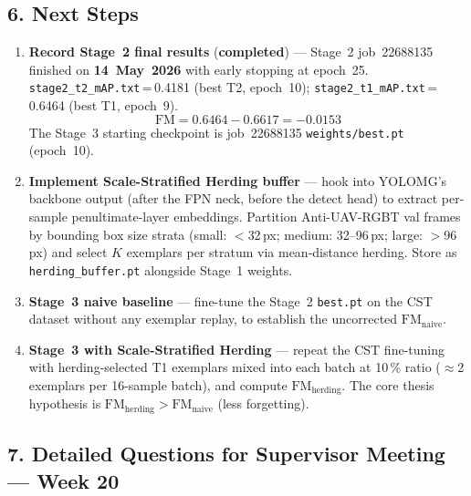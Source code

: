 \subsection*{6. Next Steps}

\begin{enumerate}
    \item \textbf{Record Stage~2 final results} (\textbf{completed}) —
          Stage~2 job~22688135 finished on \textbf{14~May~2026}
          with early stopping at epoch~25.
          \texttt{stage2\_t2\_mAP.txt}\,=\,0.4181 (best T2, epoch~10);
          \texttt{stage2\_t1\_mAP.txt}\,=\,0.6464 (best T1, epoch~9).
          \[
              \text{FM} = 0.6464 - 0.6617 = -0.0153
          \]
          The Stage~3 starting checkpoint is job~22688135
          \texttt{weights/best.pt} (epoch~10).

    \item \textbf{Implement Scale-Stratified Herding buffer} —
          hook into YOLOMG's backbone output (after the FPN neck,
          before the detect head) to extract per-sample
          penultimate-layer embeddings. Partition Anti-UAV-RGBT
          val frames by bounding box size strata
          (small: $<$32\,px; medium: 32--96\,px; large: $>$96\,px)
          and select $K$ exemplars per stratum via mean-distance
          herding. Store as \texttt{herding\_buffer.pt} alongside
          Stage~1 weights.

    \item \textbf{Stage~3 naive baseline} — fine-tune the Stage~2
          \texttt{best.pt} on the CST dataset without any
          exemplar replay, to establish the uncorrected
          $\text{FM}_{\text{naive}}$.

    \item \textbf{Stage~3 with Scale-Stratified Herding} — repeat
          the CST fine-tuning with herding-selected T1 exemplars
          mixed into each batch at 10\,\% ratio ($\approx$2 exemplars
          per 16-sample batch), and compute $\text{FM}_{\text{herding}}$.
          The core thesis hypothesis is $\text{FM}_{\text{herding}}
          > \text{FM}_{\text{naive}}$ (less forgetting).
\end{enumerate}

\subsection*{7. Detailed Questions for Supervisor Meeting — Week 20}

